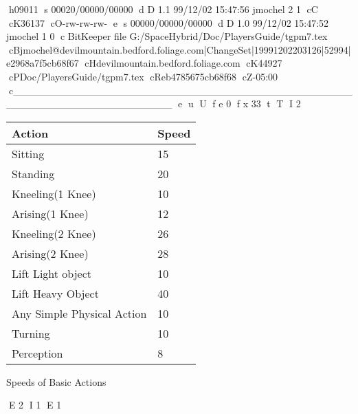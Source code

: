 h09011
s 00020/00000/00000
d D 1.1 99/12/02 15:47:56 jmochel 2 1
cC
cK36137
cO-rw-rw-rw-
e
s 00000/00000/00000
d D 1.0 99/12/02 15:47:52 jmochel 1 0
c BitKeeper file G:/SpaceHybrid/Doc/PlayersGuide/tgpm7.tex
cBjmochel@devilmountain.bedford.foliage.com|ChangeSet|19991202203126|52994|e2968a7f5cb68f67
cHdevilmountain.bedford.foliage.com
cK44927
cPDoc/PlayersGuide/tgpm7.tex
cReb4785675cb68f68
cZ-05:00
c______________________________________________________________________
e
u
U
f e 0
f x 33
t
T
I 2
\begin{SHTable}[h]
	\begin{tabular}{l|l}
	Action						& Speed \\
	\hline
	Sitting						& 15 \\
	Standing					& 20 \\
	Kneeling(1 Knee)			& 10 \\
	Arising(1 Knee)				& 12 \\
	Kneeling(2 Knee)			& 26 \\
	Arising(2 Knee)				& 28 \\
	Lift Light object			&  10 \\
	Lift Heavy Object			 &  40 \\
	Any Simple Physical Action  &  10 \\
	Turning 					&  10 \\
	Perception					&  8 \\ 
	\end{tabular}
	\caption{Speeds of Basic Actions}\label{Table:Speed}
\end{SHTable}
E 2
I 1
E 1
